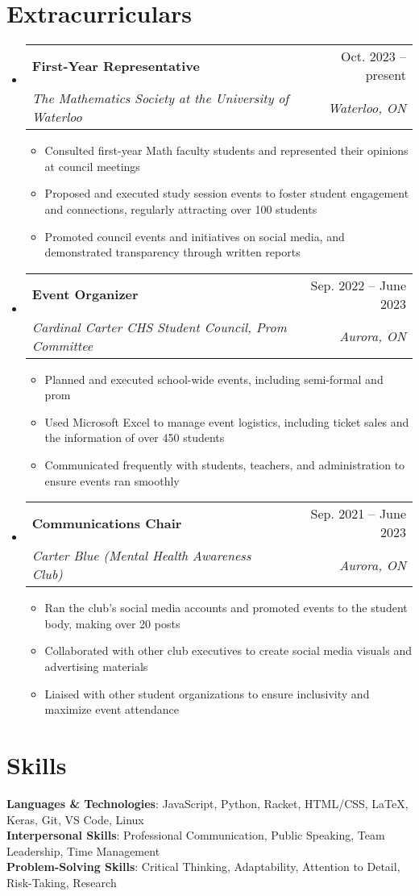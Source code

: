 \documentclass[letterpaper,11pt]{article}
\makeatletter
\newcommand{\resumeItem}[1]{
  \item\small{
    {#1 \vspace{-2pt}}
  }
}
\newcommand{\resumeSubheading}[4]{
  \vspace{-2pt}\item
    \begin{tabular*}{0.97\textwidth}[t]{l@{\extracolsep{\fill}}r}
      \textbf{#1} & #2 \\
      \textit{\small#3} & \textit{\small #4} \\
    \end{tabular*}\vspace{-7pt}
}
\newcommand{\resumeSubHeadingListStart}{\begin{itemize}[leftmargin=0.15in, label={}]}
\newcommand{\resumeSubHeadingListEnd}{\end{itemize}}
\newcommand{\resumeItemListStart}{\begin{itemize}}
\newcommand{\resumeItemListEnd}{\end{itemize}\vspace{-5pt}}
\makeatother
\begin{document}
\section{Extracurriculars}
  \resumeSubHeadingListStart

    \resumeSubheading
      {First-Year Representative}{Oct. 2023 -- present}
      {The Mathematics Society at the University of Waterloo}{Waterloo, ON}
      \resumeItemListStart
        \resumeItem{Consulted first-year Math faculty students and represented their opinions at council meetings}
        \resumeItem{Proposed and executed study session events to foster student engagement and connections, regularly attracting over 100 students}
        \resumeItem{Promoted council events and initiatives on social media, and demonstrated transparency through written reports}
      \resumeItemListEnd

    \resumeSubheading
      {Event Organizer}{Sep. 2022 -- June 2023}
      {Cardinal Carter CHS Student Council, Prom Committee}{Aurora, ON}
      \resumeItemListStart
        \resumeItem{Planned and executed school-wide events, including semi-formal and prom}
        \resumeItem{Used Microsoft Excel to manage event logistics, including ticket sales and the information of over 450 students}
        \resumeItem{Communicated frequently with students, teachers, and administration to ensure events ran smoothly}
      \resumeItemListEnd

    \resumeSubheading
      {Communications Chair}{Sep. 2021 -- June 2023}
      {Carter Blue (Mental Health Awareness Club)}{Aurora, ON}
      \resumeItemListStart
        \resumeItem{Ran the club's social media accounts and promoted events to the student body, making over 20 posts}
        \resumeItem{Collaborated with other club executives to create social media visuals and advertising materials}
        \resumeItem{Liaised with other student organizations to ensure inclusivity and maximize event attendance}
      \resumeItemListEnd

  \resumeSubHeadingListEnd

%
\section{Skills}
 \begin{itemize}[leftmargin=0.15in, label={}]
    \small{\item{
     \textbf{Languages \& Technologies}{: JavaScript, Python, Racket, HTML/CSS, LaTeX, Keras, Git, VS Code, Linux} \\
     \textbf{Interpersonal Skills}{: Professional Communication, Public Speaking, Team Leadership, Time Management} \\
     \textbf{Problem-Solving Skills}{: Critical Thinking, Adaptability, Attention to Detail, Risk-Taking, Research} \\
    }}
 \end{itemize}


\end{document}
